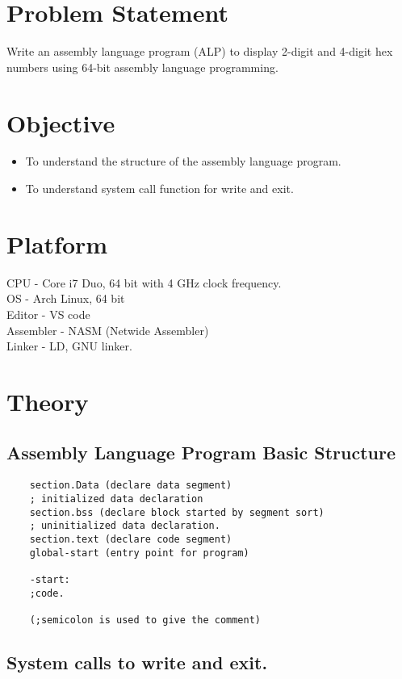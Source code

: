 \documentclass[11pt]{article}
\begin{document}
\tableofcontents
\thispagestyle{empty}
\clearpage


\section{\textbf{Problem Statement}}
Write an assembly language program (ALP) to display 2-digit and 4-digit hex numbers using 64-bit assembly language programming.

\section{\textbf{Objective}}
\begin{itemize}
    \item To understand the structure of the assembly language program.
    \item To understand system call function for write and exit.
\end{itemize}

\section{\textbf{Platform}}
CPU - Core i7 Duo, 64 bit with 4 GHz clock frequency.\\
OS - Arch Linux, 64 bit\\
Editor - VS code \\
Assembler - NASM (Netwide Assembler)\\
Linker - LD, GNU linker.

\section{\textbf{Theory}}
\subsection{\textbf{Assembly Language Program Basic Structure}}
\begin{verbatim}
    section.Data (declare data segment)
    ; initialized data declaration 
    section.bss (declare block started by segment sort)
    ; uninitialized data declaration.
    section.text (declare code segment)
    global-start (entry point for program)

    -start:
    ;code.

    (;semicolon is used to give the comment)

\end{verbatim}

\subsection{\textbf{System calls to write and exit.}}
\end{document}
